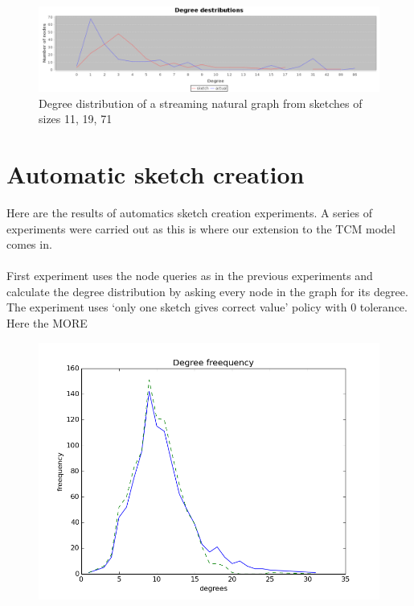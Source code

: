 \documentclass[12pt]{report}
\numberwithin{figure}{section}
\numberwithin{table}{section}
\begin{document}
\begin{figure}[H]
\centering
\includegraphics[scale=0.3]{images/ddn}
\caption{Degree distribution of a streaming natural graph from sketches of sizes 11, 19, 71}
\end{figure}

\section{Automatic sketch creation}
Here are the results of automatics sketch creation experiments. A series of experiments were carried out as this is where our extension to the TCM model comes in. 

\paragraph{}

First experiment uses the node queries as in the previous experiments and calculate the degree distribution by asking every node in the graph for its degree. The experiment uses ‘only one sketch gives correct value’ policy with 0 tolerance. Here the MORE

\begin{figure}[H]
\centering
\includegraphics[scale=0.8]{images/ddas1}

\end{figure}
\end{document}
